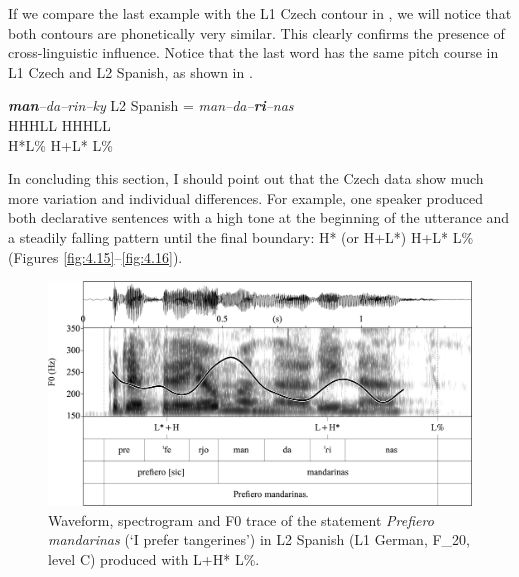If we compare the last example with the L1 Czech contour in , we will notice that both contours are phonetically very similar. This clearly confirms the presence of cross-linguistic influence. Notice that the last word has the same pitch course in L1 Czech and L2 Spanish, as shown in .


\ea\label{ex:4:3}
 \textit{\textbf{man}–da–rin–ky}         {\normalfont L2 Spanish =} \textit{man–da–\textbf{ri}–nas}\\
          {}     {H\hphantom{*an-d}H\hphantom{-}HL\hphantom{-k}L}         {}    {H\hphantom{an-d}H\hphantom{-}HL\hphantom{-n}L}\\
          {}     {H*\hphantom{an-dH-HL-k}L\%}        {}           {\hphantom{man-da-}H+L* L\%}\\
\z

In concluding this section, I should point out that the Czech data show much more variation and individual differences. For example, one speaker produced both declarative sentences with a high tone at the beginning of the utterance and a steadily falling pattern until the final boundary: H* (or H+L*) H+L* L\% (Figures \ref{fig:4.15}--\ref{fig:4.16}).

\begin{figure}
\includegraphics[width=\textwidth]{figures/Figure_4.11.png}
\caption{Waveform, spectrogram and F0 trace of the statement \textit{Prefiero mandarinas} (‘I prefer tangerines’) in L2 Spanish (L1 German, \mbox{F\_20}, level C) produced with L+H* L\%.}
\label{fig:4.11}
\end{figure}

